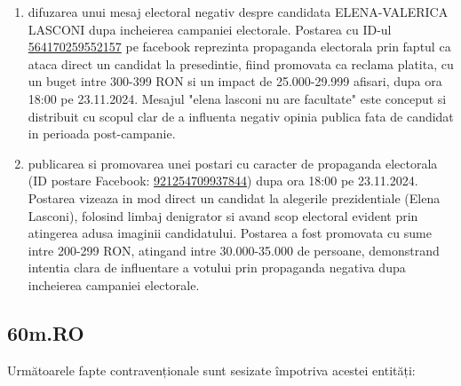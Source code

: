 \documentclass[a4paper,12pt]{article}
\begin{document}
\begin{enumerate}[leftmargin=*, label=\arabic*.)]
    \item difuzarea unui mesaj electoral negativ despre candidata ELENA-VALERICA LASCONI dupa incheierea campaniei electorale. Postarea cu ID-ul \href{https://www.facebook.com/ads/library/?id=564170259552157}{564170259552157} pe facebook reprezinta propaganda electorala prin faptul ca ataca direct un candidat la presedintie, fiind promovata ca reclama platita, cu un buget intre 300-399 RON si un impact de 25.000-29.999 afisari, dupa ora 18:00 pe 23.11.2024. Mesajul "elena lasconi nu are facultate" este conceput si distribuit cu scopul clar de a influenta negativ opinia publica fata de candidat in perioada post-campanie.
    \item publicarea si promovarea unei postari cu caracter de propaganda electorala (ID postare Facebook: \href{https://www.facebook.com/ads/library/?id=921254709937844}{921254709937844}) dupa ora 18:00 pe 23.11.2024. Postarea vizeaza in mod direct un candidat la alegerile prezidentiale (Elena Lasconi), folosind limbaj denigrator si avand scop electoral evident prin atingerea adusa imaginii candidatului. Postarea a fost promovata cu sume intre 200-299 RON, atingand intre 30.000-35.000 de persoane, demonstrand intentia clara de influentare a votului prin propaganda negativa dupa incheierea campaniei electorale.
\end{enumerate}

\vspace{0.5cm}

\subsection{60m.RO}
Următoarele fapte contravenționale sunt sesizate împotriva acestei entități:
\end{document}
